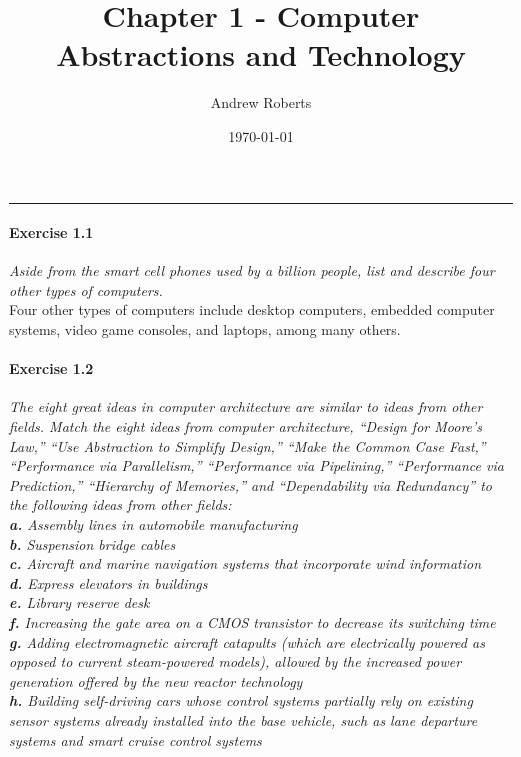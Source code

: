 \documentclass[12pt]{article}
\title{Chapter 1 - Computer Abstractions and Technology}
\author{Andrew Roberts}
\date{\today}
\begin{document}
\maketitle
{}

\noindent\rule{\linewidth}{0.5mm}

\paragraph{Exercise 1.1} \textit{Aside from the smart cell phones used by a billion people, list and
describe four other types of computers.}\\

Four other types of computers include desktop computers, embedded computer systems, video game consoles, and laptops, among many others.\\

\paragraph{Exercise 1.2} \textit{The eight great ideas in computer architecture are similar to ideas
from other fields. Match the eight ideas from computer architecture, “Design for
Moore’s Law,” “Use Abstraction to Simplify Design,” “Make the Common Case
Fast,” “Performance via Parallelism,” “Performance via Pipelining,” “Performance
via Prediction,” “Hierarchy of Memories,” and “Dependability via Redundancy” to
the following ideas from other fields:\\
\textbf{a.} Assembly lines in automobile manufacturing\\
\textbf{b.} Suspension bridge cables\\
\textbf{c.} Aircraft and marine navigation systems that incorporate wind information\\
\textbf{d.} Express elevators in buildings\\
\textbf{e.} Library reserve desk\\
\textbf{f.} Increasing the gate area on a CMOS transistor to decrease its switching time\\
\textbf{g.} Adding electromagnetic aircraft catapults (which are electrically powered
as opposed to current steam-powered models), allowed by the increased power
generation offered by the new reactor technology\\
\textbf{h.} Building self-driving cars whose control systems partially rely on existing sensor
systems already installed into the base vehicle, such as lane departure systems and
smart cruise control systems}\\
\end{document}
